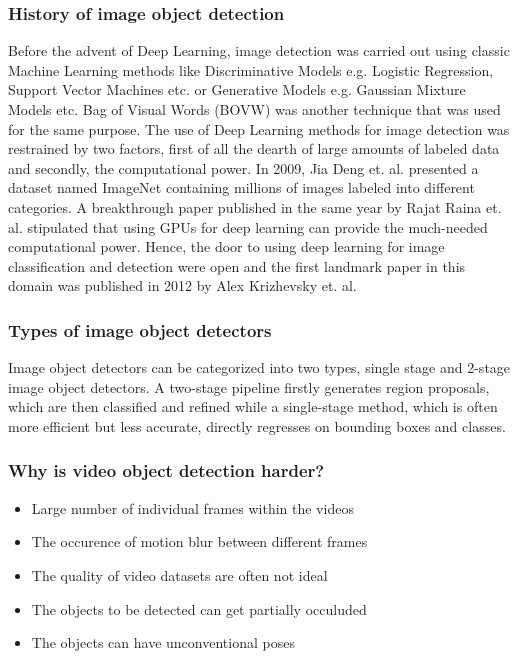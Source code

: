 \documentclass[conference]{IEEEtran}
\begin{document}
\subsubsection{History of image object detection} 
Before the advent of Deep Learning, image detection was carried out using classic Machine Learning methods like Discriminative Models e.g. Logistic Regression, Support Vector Machines etc. or Generative Models e.g. Gaussian Mixture Models etc. Bag of Visual Words (BOVW) was another technique that was used for the same purpose. The use of Deep Learning methods for image detection was restrained by two factors, first of all the dearth of large amounts of labeled data and secondly, the computational power. In 2009, Jia Deng et. al. presented a dataset named ImageNet\cite{b13} containing millions of images labeled into different categories. A breakthrough paper published in the same year by Rajat Raina\cite{b46} et. al. stipulated that using GPUs for deep learning can provide the much-needed computational power. Hence, the door to using deep learning for image classification and detection were open and the first landmark paper in this domain was published in 2012 by Alex Krizhevsky\cite{b14} et. al. \newline

\subsubsection{Types of image object detectors} 
Image object detectors can be categorized into two types, single stage and 2-stage image object detectors. A two-stage pipeline firstly generates region proposals, which are then classified and refined\cite{b17} while a single-stage method, which is often more efficient but less accurate, directly regresses on bounding boxes and classes\cite{b18}\cite{b19}. \newline

\subsubsection{Why is video object detection harder?} 
	\begin{itemize}
		\item Large number of individual frames within the videos
		\item The occurence of motion blur between different frames
		\item The quality of video datasets are often not ideal
		\item The objects to be detected can get partially occuluded
		\item The objects can have unconventional poses
	\end{itemize}
\end{document}
